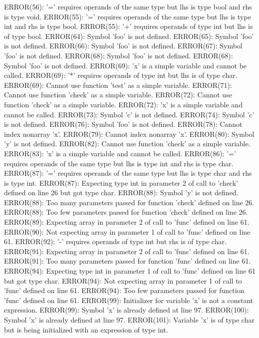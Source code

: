 \documentclass[12pt]{book}
\begin{document}
ERROR(56): '=' requires operands of the same type but lhs is type bool and rhs is type void.
ERROR(55): '=' requires operands of the same type but lhs is type int and rhs is type bool.
ERROR(55): '+' requires operands of type int but lhs is of type bool.
ERROR(64): Symbol 'foo' is not defined.
ERROR(65): Symbol 'foo' is not defined.
ERROR(66): Symbol 'foo' is not defined.
ERROR(67): Symbol 'foo' is not defined.
ERROR(68): Symbol 'foo' is not defined.
ERROR(68): Symbol 'foo' is not defined.
ERROR(69): 'x' is a simple variable and cannot be called.
ERROR(69): '*' requires operands of type int but lhs is of type char.
ERROR(69): Cannot use function 'test' as a simple variable.
ERROR(71): Cannot use function 'check' as a simple variable.
ERROR(72): Cannot use function 'check' as a simple variable.
ERROR(72): 'x' is a simple variable and cannot be called.
ERROR(73): Symbol 'c' is not defined.
ERROR(74): Symbol 'c' is not defined.
ERROR(76): Symbol 'foo' is not defined.
ERROR(78): Cannot index nonarray 'x'.
ERROR(79): Cannot index nonarray 'x'.
ERROR(80): Symbol 'y' is not defined.
ERROR(82): Cannot use function 'check' as a simple variable.
ERROR(83): 'x' is a simple variable and cannot be called.
ERROR(86): '=' requires operands of the same type but lhs is type int and rhs is type char.
ERROR(87): '=' requires operands of the same type but lhs is type char and rhs is type int.
ERROR(87): Expecting type int in parameter 2 of call to 'check' defined on line 26 but got type char.
ERROR(88): Symbol 'y' is not defined.
ERROR(88): Too many parameters passed for function 'check' defined on line 26.
ERROR(88): Too few parameters passed for function 'check' defined on line 26.
ERROR(89): Expecting array in parameter 2 of call to 'func' defined on line 61.
ERROR(90): Not expecting array in parameter 1 of call to 'func' defined on line 61.
ERROR(92): '-' requires operands of type int but rhs is of type char.
ERROR(91): Expecting array in parameter 2 of call to 'func' defined on line 61.
ERROR(91): Too many parameters passed for function 'func' defined on line 61.
ERROR(94): Expecting type int in parameter 1 of call to 'func' defined on line 61 but got type char.
ERROR(94): Not expecting array in parameter 1 of call to 'func' defined on line 61.
ERROR(94): Too few parameters passed for function 'func' defined on line 61.
ERROR(99): Initializer for variable 'x' is not a constant expression.
ERROR(99): Symbol 'x' is already defined at line 97.
ERROR(100): Symbol 'x' is already defined at line 97.
ERROR(101): Variable 'x' is of type char but is being initialized with an expression of type int.
\end{document}
